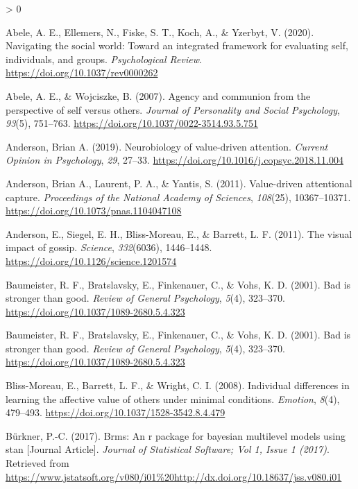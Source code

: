 \documentclass[
  english,
  man]{apa6}
\newlength{\cslhangindent}
\newenvironment{CSLReferences}[2] %
 {%
  \setlength{\parindent}{0pt}
  \ifodd #1 \everypar{\setlength{\hangindent}{\cslhangindent}}\ignorespaces\fi
  \ifnum #2 > 0
  \setlength{\parskip}{#2\baselineskip}
  \fi
 }%
 {}
\begin{document}
\hypertarget{refs}{}
\begin{CSLReferences}{1}{0}
\leavevmode\hypertarget{ref-abele_navigating_2020}{}%
Abele, A. E., Ellemers, N., Fiske, S. T., Koch, A., \& Yzerbyt, V. (2020). Navigating the social world: Toward an integrated framework for evaluating self, individuals, and groups. \emph{Psychological Review}. \url{https://doi.org/10.1037/rev0000262}

\leavevmode\hypertarget{ref-abele_agency_2007}{}%
Abele, A. E., \& Wojciszke, B. (2007). Agency and communion from the perspective of self versus others. \emph{Journal of Personality and Social Psychology}, \emph{93}(5), 751--763. \url{https://doi.org/10.1037/0022-3514.93.5.751}

\leavevmode\hypertarget{ref-anderson_neurobiology_2019}{}%
Anderson, Brian A. (2019). Neurobiology of value-driven attention. \emph{Current Opinion in Psychology}, \emph{29}, 27--33. \url{https://doi.org/10.1016/j.copsyc.2018.11.004}

\leavevmode\hypertarget{ref-anderson_value-driven_2011}{}%
Anderson, Brian A., Laurent, P. A., \& Yantis, S. (2011). Value-driven attentional capture. \emph{Proceedings of the National Academy of Sciences}, \emph{108}(25), 10367--10371. \url{https://doi.org/10.1073/pnas.1104047108}

\leavevmode\hypertarget{ref-anderson_visual_2011}{}%
Anderson, E., Siegel, E. H., Bliss-Moreau, E., \& Barrett, L. F. (2011). The visual impact of gossip. \emph{Science}, \emph{332}(6036), 1446--1448. \url{https://doi.org/10.1126/science.1201574}

\leavevmode\hypertarget{ref-baumeister_bad_2001}{}%
Baumeister, R. F., Bratslavsky, E., Finkenauer, C., \& Vohs, K. D. (2001). Bad is stronger than good. \emph{Review of General Psychology}, \emph{5}(4), 323--370. \url{https://doi.org/10.1037/1089-2680.5.4.323}

\leavevmode\hypertarget{ref-baumeister_bad_2001}{}%
Baumeister, R. F., Bratslavsky, E., Finkenauer, C., \& Vohs, K. D. (2001). Bad is stronger than good. \emph{Review of General Psychology}, \emph{5}(4), 323--370. \url{https://doi.org/10.1037/1089-2680.5.4.323}

\leavevmode\hypertarget{ref-bliss-moreau_individual_2008}{}%
Bliss-Moreau, E., Barrett, L. F., \& Wright, C. I. (2008). Individual differences in learning the affective value of others under minimal conditions. \emph{Emotion}, \emph{8}(4), 479--493. \url{https://doi.org/10.1037/1528-3542.8.4.479}

\leavevmode\hypertarget{ref-Buxfcrkner_2017}{}%
Bürkner, P.-C. (2017). Brms: An r package for bayesian multilevel models using stan {[}Journal Article{]}. \emph{Journal of Statistical Software; Vol 1, Issue 1 (2017)}. Retrieved from \url{https://www.jstatsoft.org/v080/i01\%20http://dx.doi.org/10.18637/jss.v080.i01}


\end{CSLReferences}
\end{document}
